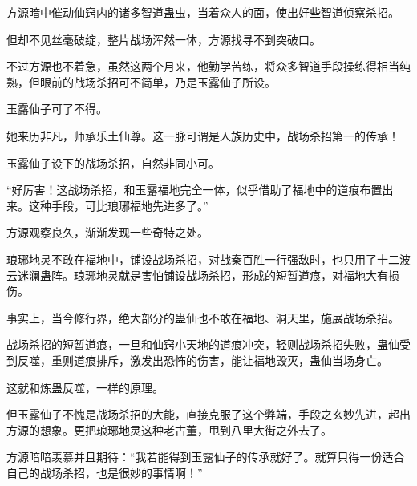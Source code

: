 \begin{this_body}
方源暗中催动仙窍内的诸多智道蛊虫，当着众人的面，使出好些智道侦察杀招。

但却不见丝毫破绽，整片战场浑然一体，方源找寻不到突破口。

不过方源也不着急，虽然这两个月来，他勤学苦练，将众多智道手段操练得相当纯熟，但眼前的战场杀招可不简单，乃是玉露仙子所设。

玉露仙子可了不得。

她来历非凡，师承乐土仙尊。这一脉可谓是人族历史中，战场杀招第一的传承！

玉露仙子设下的战场杀招，自然非同小可。

“好厉害！这战场杀招，和玉露福地完全一体，似乎借助了福地中的道痕布置出来。这种手段，可比琅琊福地先进多了。”

方源观察良久，渐渐发现一些奇特之处。

琅琊地灵不敢在福地中，铺设战场杀招，对战秦百胜一行强敌时，也只用了十二波云迷澜蛊阵。琅琊地灵就是害怕铺设战场杀招，形成的短暂道痕，对福地大有损伤。

事实上，当今修行界，绝大部分的蛊仙也不敢在福地、洞天里，施展战场杀招。

战场杀招的短暂道痕，一旦和仙窍小天地的道痕冲突，轻则战场杀招失败，蛊仙受到反噬，重则道痕排斥，激发出恐怖的伤害，能让福地毁灭，蛊仙当场身亡。

这就和炼蛊反噬，一样的原理。

但玉露仙子不愧是战场杀招的大能，直接克服了这个弊端，手段之玄妙先进，超出方源的想象。更把琅琊地灵这种老古董，甩到八里大街之外去了。

方源暗暗羡慕并且期待：“我若能得到玉露仙子的传承就好了。就算只得一份适合自己的战场杀招，也是很妙的事情啊！”

\end{this_body}

